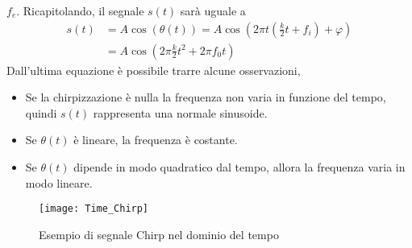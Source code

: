 $f_e$.
Ricapitolando, il segnale $s(t)$ sarà uguale a 
\begin{equation}
\begin{split}
        s(t) &=A\cos(\theta(t)) 
             =A\cos\left(2\pi t\left(\frac{k}{2}t+f_i\right) +
             \varphi\right)\\
             & = A\cos\left(2\pi\frac{k}{2}t^2+2\pi f_0 t\right)
\end{split}
\end{equation}
Dall'ultima equazione è possibile trarre alcune osservazioni, 
\begin{itemize}
        \item Se la chirpizzazione è nulla la frequenza non varia in funzione del
        tempo, quindi $s(t)$ rappresenta una normale sinusoide.
        \item Se $\theta(t)$ è lineare, la frequenza è costante. 
        \item Se $\theta(t)$ dipende in modo quadratico dal tempo, allora la
        frequenza varia in modo lineare.
\end{itemize}

\begin{figure}[ht]
        \centering
                \texttt{[image: Time\_Chirp]}
        \caption{Esempio di segnale Chirp nel dominio del tempo}
\end{figure}

